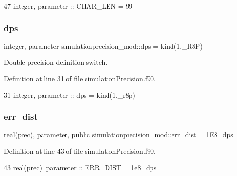 \begin{DoxyCode}
47     \textcolor{keywordtype}{integer}, \textcolor{keywordtype}{parameter} :: CHAR\_LEN = 99
\end{DoxyCode}
\mbox{\label{namespacesimulationprecision__mod_a1993497bc3b1b9925d3e409fe8891e8c}} 
\subsubsection{\texorpdfstring{dps}{dps}}
{\footnotesize\ttfamily integer, parameter simulationprecision\+\_\+mod\+::dps = kind(1.\+\_\+\+R8P)\hspace{0.3cm}{\ttfamily [private]}}



Double precision definition switch. 



Definition at line 31 of file simulation\+Precision.\+f90.


\begin{DoxyCode}
31     \textcolor{keywordtype}{integer},  \textcolor{keywordtype}{parameter} :: dps  = kind(1.\_r8p)   
\end{DoxyCode}
\mbox{\label{namespacesimulationprecision__mod_adb76b934d7acaf56b275c5cc1ecccc4c}} 
\subsubsection{\texorpdfstring{err\+\_\+dist}{err\_dist}}
{\footnotesize\ttfamily real(\mbox{\hyperlink{namespacesimulationprecision__mod_a361ca48174e0dc2228c07f25fa5396ec}{prec}}), parameter, public simulationprecision\+\_\+mod\+::err\+\_\+dist = 1\+E8\+\_\+dps}



Definition at line 43 of file simulation\+Precision.\+f90.


\begin{DoxyCode}
43     \textcolor{keywordtype}{real(prec)}, \textcolor{keywordtype}{parameter} :: ERR\_DIST = 1e8\_dps
\end{DoxyCode}
\mbox{\label{namespacesimulationprecision__mod_a7931657e14fb825c4e20dc77ee8f7278}} 
